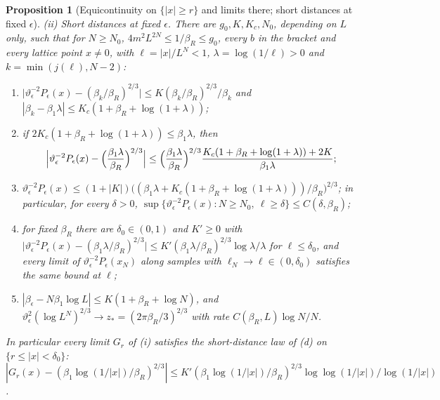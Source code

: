\documentclass[11pt]{amsart}
\newtheorem{proposition}[theorem]{Proposition}
\theoremstyle{definition}
\theoremstyle{remark}
\numberwithin{equation}{section}
\begin{document}
\begin{proposition}[Equicontinuity on $\{|x|\ge r\}$ and limits there; short distances at fixed $\epsilon$]
\smallskip\noindent\textup{(ii) Short distances at fixed $\epsilon$.} There are $g_0,K,K_c,N_0$, depending on $L$ only,
such that for $N\ge N_0$, $4m^2L^{2N}\le1/\beta_R\le g_0$, every $b$ in the bracket and every lattice point $x\ne0$,
with $\ell=|x|/L^N<1$, $\lambda=\log(1/\ell)>0$ and $k=\min(j(\ell),N-2)$:
\begin{enumerate}[label=(\alph*)]
\item $\bigl|\vartheta_\epsilon^{-2}P_\epsilon(x)-(\beta_k/\beta_R)^{2/3}\bigr|\le K(\beta_k/\beta_R)^{2/3}/\beta_k$ and
$|\beta_k-\beta_1\lambda|\le K_c(1+\beta_R+\log(1+\lambda))$;
\item if $2K_c(1+\beta_R+\log(1+\lambda))\le\beta_1\lambda$, then
\[
\Bigl|\vartheta_\epsilon^{-2}P_\epsilon(x)-\Bigl(\frac{\beta_1\lambda}{\beta_R}\Bigr)^{2/3}\Bigr|\le
\Bigl(\frac{\beta_1\lambda}{\beta_R}\Bigr)^{2/3}\frac{K_c(1+\beta_R+\log(1+\lambda))+2K}{\beta_1\lambda};
\]
\item $\vartheta_\epsilon^{-2}P_\epsilon(x)\le(1+|K|)\bigl((\beta_1\lambda+K_c(1+\beta_R+\log(1+\lambda)))/\beta_R\bigr)^{2/3}$;
in particular, for every $\delta>0$, $\sup\{\vartheta_\epsilon^{-2}P_\epsilon(x):N\ge N_0,\ \ell\ge\delta\}\le C(\delta,\beta_R)$;
\item for fixed $\beta_R$ there are $\delta_0\in(0,1)$ and $K'\ge0$ with
$\bigl|\vartheta_\epsilon^{-2}P_\epsilon(x)-(\beta_1\lambda/\beta_R)^{2/3}\bigr|\le K'(\beta_1\lambda/\beta_R)^{2/3}\log\lambda/\lambda$
for $\ell\le\delta_0$, and every limit of $\vartheta_\epsilon^{-2}P_\epsilon(x_N)$ along samples with $\ell_N\to\ell\in(0,\delta_0)$
satisfies the same bound at $\ell$;
\item $|\beta_\epsilon-N\beta_1\log L|\le K(1+\beta_R+\log N)$, and
$\vartheta_\epsilon^2(\log L^N)^{2/3}\to z_*=(2\pi\beta_R/3)^{2/3}$ with rate $C(\beta_R,L)\log N/N$.
\end{enumerate}
In particular every limit $G_r$ of (i) satisfies the short-distance law of (d) on $\{r\le|x|<\delta_0\}$:
$|G_r(x)-(\beta_1\log(1/|x|)/\beta_R)^{2/3}|\le K'(\beta_1\log(1/|x|)/\beta_R)^{2/3}\log\log(1/|x|)/\log(1/|x|)$.
\end{proposition}
\end{document}
